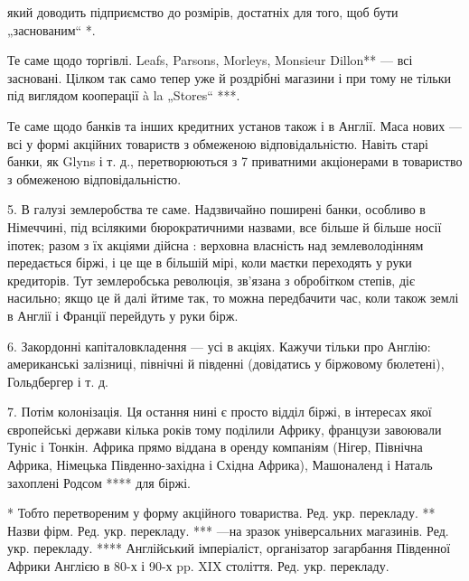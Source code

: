 \parcont{}  %
який доводить підприємство до розмірів, достатніх для того, щоб бути „заснованим“ *.

Те саме щодо торгівлі. Leafs, Parsons, Morleys, Monsieur Dillon** — всі засновані. Цілком так само тепер уже й роздрібні
магазини і при тому не тільки під виглядом кооперації à la „Stores“ ***.

Те саме щодо банків та інших кредитних установ також і в Англії. Маса нових — всі у формі акційних товариств з обмеженою
відповідальністю. Навіть старі банки, як Glyns і т. д., перетворюються з 7 приватними акціонерами в товариство з обмеженою відповідальністю.

5. В галузі землеробства те саме. Надзвичайно поширені банки, особливо в Німеччині, під всілякими
бюрократичними назвами, все більше й більше носії іпотек; разом з їх акціями дійсна :  верховна власність над
землеволодінням передається біржі, і це
ще в більшій мірі, коли маєтки переходять у руки кредиторів. Тут землеробська революція, зв’язана з обробітком степів, діє
насильно; якщо це й далі йтиме так, то можна передбачити час, коли також землі в Англії і Франції перейдуть у руки бірж.

6. Закордонні капіталовкладення — усі в акціях. Кажучи тільки про Англію: американські залізниці, північні й південні
(довідатись у біржовому бюлетені), Гольдбергер і т. д.

7. Потім колонізація. Ця остання нині є просто відділ біржі, в інтересах
якої європейські держави кілька років тому поділили Африку, французи завоювали Туніс і Тонкін. Африка прямо віддана в
оренду компаніям (Нігер, Північна Африка, Німецька Південно-західна і Східна Африка), Машоналенд і Наталь захоплені Родсом
**** для біржі.

* Тобто перетвореним у форму акційного товариства. Ред. укр. перекладу.
** Назви фірм. Ред. укр. перекладу.
*** —на зразок універсальних магазинів. Ред. укр. перекладу.
**** Англійський імперіаліст, організатор загарбання Південної Африки Англією в 80-х і 90-х pp. XIX століття. Ред. укр.
перекладу.
